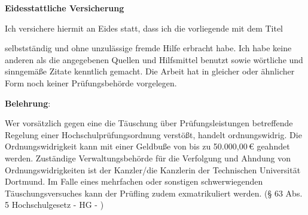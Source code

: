 \makeatletter
\cleardoublepage
\thispagestyle{empty}
\linespread{1.25}
\LARGE
\begin{center}
	\textbf{Eidesstattliche Versicherung}
\end{center}

\small
\vspace{\baselineskip}
\underline{\makebox[.4\textwidth][c]{\mySurname, \myForename}}
\hspace{.25\textwidth}
\underline{\makebox[.3\textwidth][c]{\myMatNr}}
\newline
{}
\hspace{.25\textwidth}
\vspace{\baselineskip}

\noindent Ich versichere hiermit an Eides statt, dass ich die vorliegende \myDocType\space mit dem Titel

\begin{center}
\underline{\makebox[0.97\textwidth][c]{\textit{\myTitle}}}
\end{center}

\noindent selbstständig und ohne unzulässige fremde Hilfe erbracht habe. Ich habe keine anderen als die 
angegebenen Quellen und Hilfsmittel benutzt sowie wörtliche und sinngemäße Zitate kenntlich 
gemacht. Die Arbeit hat in gleicher oder ähnlicher Form noch keiner Prü\-fungs\-be\-hörde 
vorgelegen. 
\vspace{\baselineskip}

\underline{\makebox[.4\textwidth][c]{\myLocation, \myDate}} %
\hspace{.25\textwidth}
\underline{\hspace{.3\textwidth}}
\newline
{}
\hspace{.25\textwidth}

\vspace{\baselineskip}

\noindent \textbf{Belehrung}: 

\noindent Wer vorsätzlich gegen eine die Täuschung über Prüfungsleistungen betreffende Regelung einer 
Hochschulprüfungsordnung verstößt, handelt ordnungswidrig. Die Ordnungswidrigkeit kann mit 
einer Geldbuße von bis zu 50.000,00\,€ geahndet werden. Zuständige Verwaltungs\-behörde für 
die Verfolgung und Ahndung von Ordnungswidrigkeiten ist der Kanzler/die Kanzlerin der 
Technischen Universität Dortmund. Im Falle eines mehrfachen oder sonstigen schwerwiegenden 
Täuschungs\-versuches kann der Prüfling zudem exmatrikuliert werden. (§ 63 Abs. 5 
Hochschulgesetz - HG - )  

